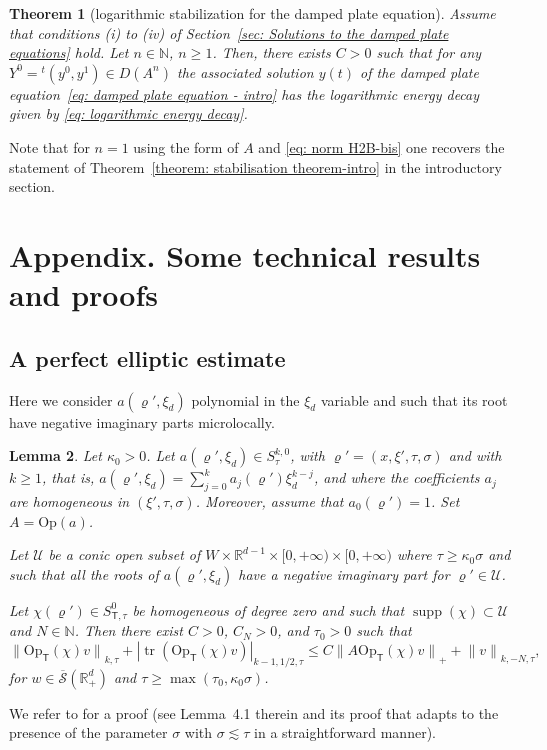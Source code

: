 \documentclass[JEP,XML,SOM,Unicode,published]{cedram}
\theoremstyle{plain}
\newtheorem{theorem}{Theorem}[section]
\newtheorem{lemma}[theorem]{Lemma}
\theoremstyle{definition}
\def\R{\mathbb{R}}
\def\N{\mathbb{N}}
\let\k\kappa
\let\y\varrho
\newcommand{\U}{\mathscr U}
\newcommand{\Op}{\ensuremath{\mathrm{Op}}}
\newcommand{\Opt}{\ensuremath{\mathrm{Op}_{\scriptscriptstyle{\mathsf{T}}}}}
\newcommand{\transp}{\ensuremath{\phantom{}^{t}}}
\newcommand{\Norm}[2]{{\| #1 \|}_{#2}}
\newcommand{\Normsc}[2]{{\| #1 \|}_{#2, \tau}}
\newcommand{\normsc}[2]{{| #1 |}_{#2, \tau}}
\newcommand{\Ssc}{S_\tau}
\newcommand{\Ssct}{S_{{\scriptscriptstyle{\mathsf T}},\tau}}
\newcommand{\Sbarp}{\ensuremath{\overline{\mathscr{S}}(\Rdp)}}
\newcommand{\Rdp}{\R^d_+}
\DeclareMathOperator{\supp}{supp}
\DeclareMathOperator{\trace}{tr}
\begin{document}
\begin{theorem}[logarithmic stabilization for the damped plate equation]
\label{theorem: stabilisation theorem}
Assume that conditions (i) to (iv) of Section~\ref{sec: Solutions to
the damped plate equations} hold. Let $n \in \N$, $n \geq 1$. Then, there exists $C>0$ such
that for any $Y^0 =\transp(y^0,y^1) \in D(A^n)$ the associated
solution $y(t)$ of the damped plate equation~\eqref{eq: damped plate equation - intro} has the logarithmic energy decay given by \eqref{eq: logarithmic energy decay}.
\end{theorem}
Note that for $n=1$ using the form of $A$ and \eqref{eq: norm H2B-bis}
one recovers the statement of Theorem~\ref{theorem: stabilisation theorem-intro} in the introductory section.

\appendix

\section*{Appendix. Some technical results and proofs}

\subsection{A perfect elliptic estimate}
\label{SB}
Here we consider $a(\y',\xi_d)$ polynomial in the $\xi_d$ variable and
such that its root have negative imaginary parts microlocally.

\begin{lemma}\label{el1}
Let $\k_0 >0$.
Let $a(\y',\xi_d)\in \Ssc^{k,0}$, with $\y'=(x,\xi',\tau,\sigma)$ and with
$k\geq 1$,
that is, $a(\y',\xi_d) = \sum_{j=0}^k a_j (\y') \xi_d^{k-j}$,
and where the coefficients $a_j$ are homogeneous in
$(\xi',\tau,\sigma)$. Moreover, assume that $a_0(\y') =1$.
Set $A=\Op(a)$.

Let $\U$ be a conic open subset of $W \times\R^{d-1}\times
[0,+\infty) \times[0,+\infty)$ where $\tau \geq \k_0 \sigma$ and such
that all the roots of $a(\y',\xi_d)$ have a negative imaginary part for $\y'\in\U$.

Let $\chi(\y')\in \Ssct^{0}$ be homogeneous of degree zero and such
that $\supp(\chi)\subset\U$ and $N\in\N$. Then there exist $C>0$, $C_N>0$, and $\tau_0>0$ such that
\begin{equation*}
\Normsc{\Opt(\chi)v}{k}
+ \normsc{\trace(\Opt(\chi)v)}{k-1,1/2}
\leq C
\Norm{A \Opt(\chi) v}{+}
+ \Normsc{v}{k,-N},
\end{equation*}
for $w\in\Sbarp$ and $\tau\geq \max (\tau_0,\k_0 \sigma)$.
\end{lemma}
We refer to \cite{ML} for a proof (see Lemma~4.1 therein and its
proof that adapts to the presence of the parameter $\sigma$ with
$\sigma\lesssim \tau$ in a straightforward manner).
\end{document}
